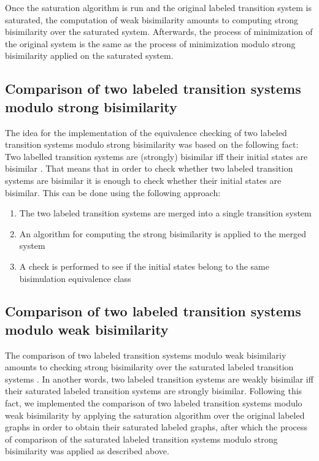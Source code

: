 Once the saturation algorithm is run and the original labeled transition system is saturated, the computation of weak bisimilarity amounts to computing strong bisimilarity over the saturated system. Afterwards, the process of minimization of the original system is the same as the process of minimization modulo strong bisimilarity applied on the saturated system.

\subsection{Comparison of two labeled transition systems modulo strong bisimilarity}
The idea for the implementation of the equivalence checking of two labeled transition systems modulo strong bisimilarity was based on the following fact: Two labelled transition systems are (strongly) bisimilar iff their initial states are bisimilar \cite{ModellingAndAnalysis}. That means that in order to check whether two labeled transition systems are bisimilar it is enough to check whether their initial states are bisimilar. This can be done using the following approach:
\begin{enumerate}
	\item The two labeled transition systems are merged into a single transition system
	\item An algorithm for computing the strong bisimilarity is applied to the merged system
	\item A check is performed to see if the initial states belong to the same bisimulation equivalence class
\end{enumerate}

\subsection{Comparison of two  labeled transition systems modulo weak bisimilarity}
The comparison of two labeled transition systems modulo weak bisimilariy amounts to checking strong bisimilarity over the saturated labeled transition systems \cite{ReactiveSystems}. In another words, two labeled transition systems are weakly bisimilar iff their saturated labeled transition systems are strongly bisimilar. Following this fact, we implemented the comparison of two labeled transition systems modulo weak bisimilarity by applying the saturation algorithm over the original labeled graphs in order to obtain their saturated labeled graphs, after which the process of comparison of the saturated labeled transition systems modulo strong bisimilarity was applied as described above.